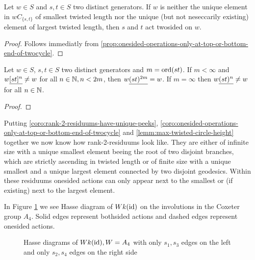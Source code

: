 \begin{coro}
	Let $w \in S$ and $s,t \in S$ two distinct generators. If $w$ is neither the unique element in $wC_{\{s,t\}}$ of smallest twisted length nor the unique (but not neseccarily existing) element of largest twisted length, then $s$ and $t$ act twosided on $w$.

	\begin{proof}
		Follows immediatly from \ref{prop:onesided-operations-only-at-top-or-bottom-end-of-twocycle}.
	\end{proof}
\end{coro}

\begin{lemm}
	Let $w \in S$, $s,t \in S$ two distinct generators and $m = \operatorname{ord}(st)$. If $m < \infty$ and $w \underline{[st]^n} \neq w$ for all $n \in \mathbb{N}, n < 2m$, then $w \underline{(st)^{2m}} = w$. If $m = \infty$ then $w \underline{(st)^n} \neq w$ for all $n \in \mathbb{N}$.

	\begin{proof}
		\todo
	\end{proof}
\end{lemm}

Putting \ref{coro:rank-2-residuums-have-unique-peeks}, \ref{coro:onesided-operations-only-at-top-or-bottom-end-of-twocycle} and \ref{lemm:max-twisted-circle-height} together we now know how rank-2-residuums look like. They are either of infinite size with a unique smallest element beeing the root of two disjoint branches, which are strictly ascending in twisted length or of finite size with a unique smallest and a unique largest element connected by two disjoint geodesics. Within these residuums onesided actions can only appear next to the smallest or (if existing) next to the largest element.

\begin{exam}
	In Figure \ref{fig:a4_s1s3-and-a4_s2s4} we see Hasse diagram of $Wk(\operatorname{id})$ on the involutions in the Coxeter group $A_4$. Solid edges represent bothsided actions and dashed edges represent onesided actions.
	\begin{figure}[ht]
		\centering
		
		\quad \quad \quad
		
		\caption{Hasse diagrams of $Wk(\operatorname{id}), W = A_4$ with only $s_1,s_3$ edges on the left and only $s_2,s_4$ edges on the right side}
		\label{fig:a4_s1s3-and-a4_s2s4}
	\end{figure}
\end{exam}